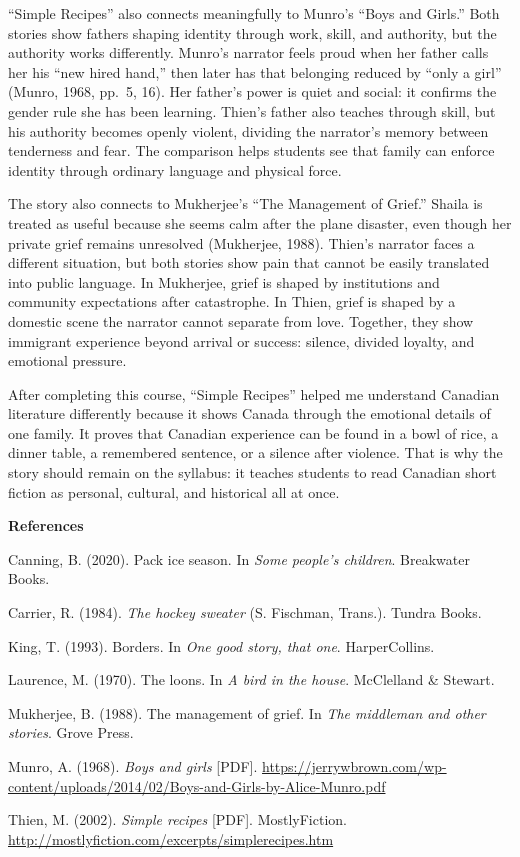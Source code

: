 \documentclass[12pt]{article}
\begin{document}
``Simple Recipes'' also connects meaningfully to Munro's ``Boys and Girls.'' Both stories show fathers shaping identity through work, skill, and authority, but the authority works differently. Munro's narrator feels proud when her father calls her his ``new hired hand,'' then later has that belonging reduced by ``only a girl'' (Munro, 1968, pp.~5, 16). Her father's power is quiet and social: it confirms the gender rule she has been learning. Thien's father also teaches through skill, but his authority becomes openly violent, dividing the narrator's memory between tenderness and fear. The comparison helps students see that family can enforce identity through ordinary language and physical force.

The story also connects to Mukherjee's ``The Management of Grief.'' Shaila is treated as useful because she seems calm after the plane disaster, even though her private grief remains unresolved (Mukherjee, 1988). Thien's narrator faces a different situation, but both stories show pain that cannot be easily translated into public language. In Mukherjee, grief is shaped by institutions and community expectations after catastrophe. In Thien, grief is shaped by a domestic scene the narrator cannot separate from love. Together, they show immigrant experience beyond arrival or success: silence, divided loyalty, and emotional pressure.

After completing this course, ``Simple Recipes'' helped me understand Canadian literature differently because it shows Canada through the emotional details of one family. It proves that Canadian experience can be found in a bowl of rice, a dinner table, a remembered sentence, or a silence after violence. That is why the story should remain on the syllabus: it teaches students to read Canadian short fiction as personal, cultural, and historical all at once.

\clearpage

\begin{center}
\textbf{References}
\end{center}

\hangindent=0.5in\noindent Canning, B. (2020). Pack ice season. In \textit{Some people's children}. Breakwater Books.

\hangindent=0.5in\noindent Carrier, R. (1984). \textit{The hockey sweater} (S. Fischman, Trans.). Tundra Books.

\hangindent=0.5in\noindent King, T. (1993). Borders. In \textit{One good story, that one}. HarperCollins.

\hangindent=0.5in\noindent Laurence, M. (1970). The loons. In \textit{A bird in the house}. McClelland \& Stewart.

\hangindent=0.5in\noindent Mukherjee, B. (1988). The management of grief. In \textit{The middleman and other stories}. Grove Press.

\hangindent=0.5in\noindent Munro, A. (1968). \textit{Boys and girls} [PDF]. \url{https://jerrywbrown.com/wp-content/uploads/2014/02/Boys-and-Girls-by-Alice-Munro.pdf}

\hangindent=0.5in\noindent Thien, M. (2002). \textit{Simple recipes} [PDF]. MostlyFiction. \url{http://mostlyfiction.com/excerpts/simplerecipes.htm}
\end{document}
